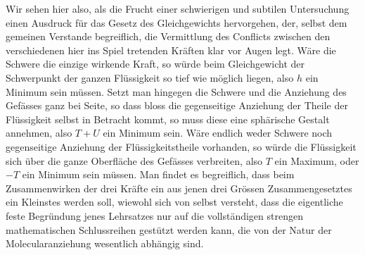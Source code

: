 Wir sehen hier also, als die Frucht einer schwierigen und subtilen Untersuchung
einen Ausdruck für das Gesetz des Gleichgewichts hervorgehen, der, selbst dem
gemeinen Verstande begreiflich, die Vermittlung des Conflicts zwischen den
verschiedenen hier ins Spiel tretenden Kräften klar vor Augen legt. Wäre die
Schwere die einzige wirkende Kraft, so würde beim Gleichgewicht der Schwerpunkt
der ganzen Flüssigkeit so tief wie möglich liegen, also $h$ ein Minimum sein
müssen. Setzt man hingegen die Schwere und die Anziehung des Gefässes ganz bei
Seite, so dass bloss die gegenseitige Anziehung der Theile der Flüssigkeit selbst
in Betracht kommt, so muss diese eine sphärische Gestalt annehmen, also $T+U$
ein Minimum sein. Wäre endlich weder Schwere noch gegenseitige Anziehung der
Flüssigkeitstheile vorhanden, so würde die Flüssigkeit sich über die ganze
Oberfläche des Gefässes verbreiten, also $T$ ein Maximum, oder $-T$ ein Minimum
sein müssen. Man findet es begreiflich, dass beim Zusammenwirken der drei Kräfte
ein aus jenen drei Grössen Zusammengesetztes ein Kleinstes werden soll, wiewohl
sich von selbst versteht, dass die eigentliche feste Begründung jenes Lehrsatzes
nur auf die vollständigen strengen mathematischen Schlussreihen gestützt werden
kann, die von der Natur der Molecularanziehung wesentlich abhängig sind.

